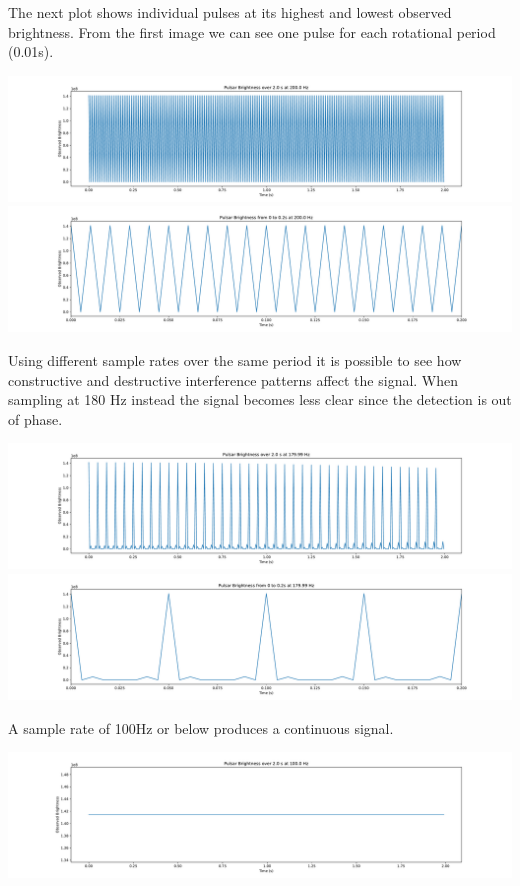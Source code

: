 \documentclass{article}
\begin{document}
The next plot shows individual pulses at its highest and lowest observed
brightness. From the first image we can see one pulse for each rotational period
(0.01s).

\includegraphics[width=\textwidth]{brightness_200.0_hz.pdf}
\includegraphics[width=\textwidth]{brightness_200.0_hz_range.pdf}

Using different sample rates over the same period it is possible to see how
constructive and destructive interference patterns affect the signal. When
sampling at 180 Hz instead the signal becomes less clear since the detection
is out of phase.

\includegraphics[width=\textwidth]{brightness_179.99_hz.pdf}
\includegraphics[width=\textwidth]{brightness_179.99_hz_range.pdf}

A sample rate of 100Hz or below produces a continuous signal.

\includegraphics[width=\textwidth]{brightness_100.0_hz.pdf}
\end{document}
